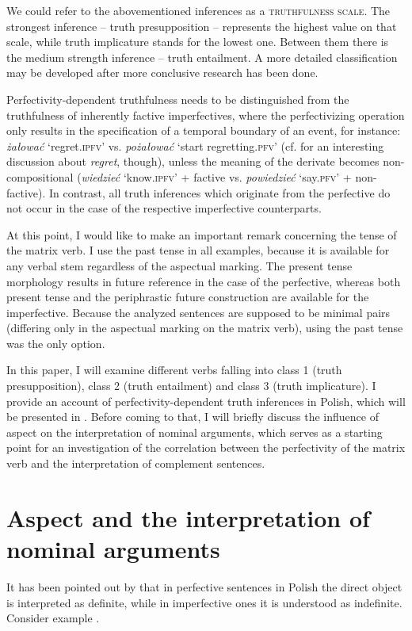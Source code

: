 \documentclass[output=paper,
  modfonts,
  newtxmath,
  hidelinks
		  ]{langscibook}
\begin{document}
We could refer to the abovementioned inferences as a \textsc{truthfulness scale}. The strongest inference -- truth presupposition -- represents the highest value on that scale, while truth implicature stands for the lowest one. Between them there is the medium strength inference -- truth entailment. A more detailed classification may be developed after more conclusive research has been done.

Perfectivity-dependent truthfulness needs to be distinguished from the truthfulness of inherently factive imperfectives, where the perfectivizing operation only results in the specification of a temporal boundary of an event, for instance: \textit{żałować} `regret.\textsc{ipfv}’ vs. \textit{pożałować} `start regretting.\textsc{pfv}’ (cf. \citealt{Egré2008} for an interesting discussion about \textit{regret}, though), unless the meaning of the derivate becomes non-compositional (\textit{wiedzieć}
`know.\textsc{ipfv}’ + factive vs. \textit{powiedzieć} `say.\textsc{pfv}’ + non-factive). In contrast, all truth inferences which originate from the perfective do not occur in the case of the respective imperfective counterparts.\par At this point, I would like to make an important remark concerning the tense of the matrix verb. I use the past tense in all examples, because it is available for any verbal stem regardless of the aspectual marking. The present tense morphology results in future reference in the case of the perfective, whereas both present tense and the periphrastic future construction are available for the imperfective. Because the analyzed sentences are supposed to be minimal pairs (differing only in the aspectual marking on the matrix verb), using the past tense was the only option.\par In this paper, I will examine different verbs falling into class 1 (truth presupposition), class 2 (truth entailment) and class 3 (truth implicature). I provide an account of perfectivity-dependent truth inferences in Polish, which will be presented in . Before coming to that, I will briefly discuss the influence of aspect on the interpretation of nominal arguments, which serves as a starting point for an investigation of the correlation between the perfectivity of the matrix verb and the interpretation of complement sentences.

\section{Aspect and the interpretation of nominal arguments}
It has been pointed out by \cite{Wierzbicka1967} that in perfective sentences in Polish the direct object is interpreted as definite, while in imperfective ones it is understood as indefinite. Consider example .
\end{document}
